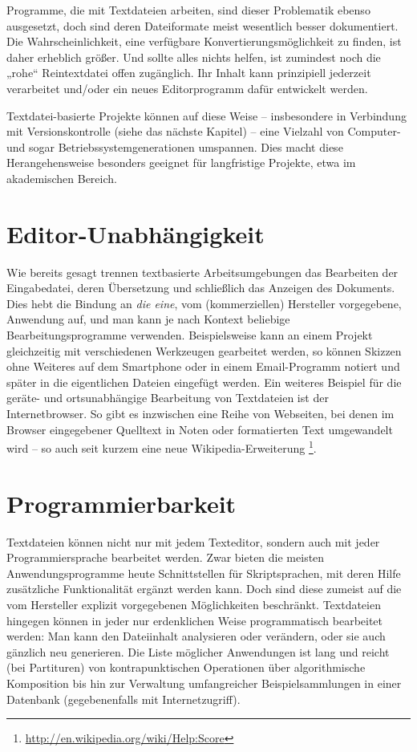 \documentclass[DIV=12]{scrreprt}
\begin{document}
Programme, die mit Textdateien arbeiten, sind dieser Problematik ebenso ausgesetzt, doch sind deren Dateiformate meist wesentlich besser dokumentiert.
Die Wahrscheinlichkeit, eine verfügbare Konvertierungsmöglichkeit zu finden, ist daher erheblich größer.
Und sollte alles nichts helfen, ist zumindest noch die „rohe“ Reintextdatei offen zugänglich.
Ihr Inhalt kann prinzipiell jederzeit verarbeitet und/oder ein neues Editorprogramm dafür entwickelt werden.

Textdatei-basierte Projekte können auf diese Weise -- insbesondere in Verbindung mit Versionskontrolle (siehe das nächste Kapitel) -- eine Vielzahl von Computer- und sogar Betriebssystemgenerationen umspannen.
Dies macht diese Herangehensweise besonders geeignet für langfristige Projekte, etwa im akademischen Bereich.

\section{Editor-Unabhängigkeit}
\label{sec:pt_editor-independence}
Wie bereits gesagt trennen textbasierte Arbeitsumgebungen das Bearbeiten der Eingabedatei, deren Übersetzung und schließlich das Anzeigen des Dokuments.
Dies hebt die Bindung an \emph{die eine}, vom (kommerziellen) Hersteller vorgegebene, Anwendung auf, und man kann je nach Kontext beliebige Bearbeitungsprogramme verwenden.
Beispielsweise kann an einem Projekt gleichzeitig mit verschiedenen Werkzeugen gearbeitet werden, so können Skizzen ohne Weiteres auf dem Smartphone oder in einem Email-Programm notiert und später in die eigentlichen Dateien eingefügt werden.
Ein weiteres Beispiel für die geräte- und ortsunabhängige Bearbeitung von Textdateien ist der Internetbrowser.
So gibt es inzwischen eine Reihe von Webseiten, bei denen im Browser eingegebener Quelltext in Noten oder formatierten Text umgewandelt wird -- so auch seit kurzem eine neue Wikipedia-Erweiterung%
\footnote{\url{http://en.wikipedia.org/wiki/Help:Score}}.

\section{Programmierbarkeit}
\label{sec:pt_programmability}
Textdateien können nicht nur mit jedem Texteditor, sondern auch mit jeder Programmiersprache bearbeitet werden.
Zwar bieten die meisten Anwendungsprogramme heute Schnittstellen für Skriptsprachen, mit deren Hilfe zusätzliche Funktionalität ergänzt werden kann.
Doch sind diese zumeist auf die vom Hersteller explizit vorgegebenen Möglichkeiten beschränkt.
Textdateien hingegen können in jeder nur erdenklichen Weise programmatisch bearbeitet werden: Man kann den Dateiinhalt analysieren oder verändern, oder sie auch gänzlich neu generieren.
Die Liste möglicher Anwendungen ist lang und reicht (bei Partituren) von kontrapunktischen Operationen über algorithmische Komposition bis hin zur Verwaltung umfangreicher Beispielsammlungen in einer Datenbank (gegebenenfalls mit Internetzugriff).
\end{document}
